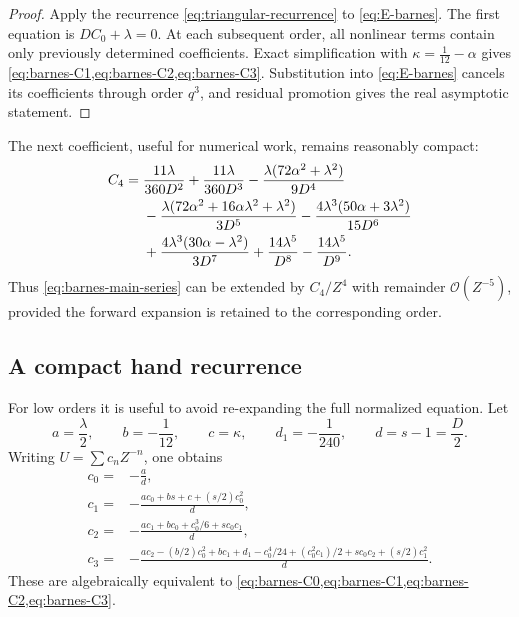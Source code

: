 \documentclass[11pt,a4paper]{article}
\numberwithin{equation}{section}
\theoremstyle{definition}
\theoremstyle{remark}
\newcommand{\Ord}{\mathcal O}
\begin{document}
\begin{proof}
Apply the recurrence \cref{eq:triangular-recurrence} to
\cref{eq:E-barnes}.  The first equation is \(DC_0+\lambda=0\).  At each
subsequent order, all nonlinear terms contain only previously determined
coefficients.  Exact simplification with
\(\kappa=\tfrac1{12}-\alpha\) gives
\cref{eq:barnes-C1,eq:barnes-C2,eq:barnes-C3}.  Substitution into
\cref{eq:E-barnes} cancels its coefficients through order \(q^3\), and
residual promotion gives the real asymptotic statement.
\end{proof}

The next coefficient, useful for numerical work, remains reasonably
compact:
\begin{align}
 C_4={}&\frac{11\lambda}{360D^2}+\frac{11\lambda}{360D^3}
 -\frac{\lambda(72\alpha^2+\lambda^2)}{9D^4}
 \notag\\
 &-\frac{\lambda(72\alpha^2+16\alpha\lambda^2+\lambda^2)}{3D^5}
 -\frac{4\lambda^3(50\alpha+3\lambda^2)}{15D^6}
 \notag\\
 &+\frac{4\lambda^3(30\alpha-\lambda^2)}{3D^7}
 +\frac{14\lambda^5}{D^8}-\frac{14\lambda^5}{D^9}.
 \label{eq:barnes-C4}
\end{align}
Thus \cref{eq:barnes-main-series} can be extended by \(C_4/Z^4\) with
remainder \(\Ord(Z^{-5})\), provided the forward expansion is retained to
the corresponding order.

\subsection{A compact hand recurrence}

For low orders it is useful to avoid re-expanding the full normalized
equation.  Let
\begin{equation}
 a=\frac\lambda2,\qquad b=-\frac1{12},\qquad c=\kappa,
 \qquad d_1=-\frac1{240},\qquad d=s-1=\frac D2.
 \label{eq:barnes-short-symbols}
\end{equation}
Writing \(U=\sum c_nZ^{-n}\), one obtains
\begin{align}
 c_0={}&-\frac{a}{d},
 \label{eq:barnes-hand0}\\
 c_1={}&-\frac{ac_0+bs+c+(s/2)c_0^2}{d},
 \label{eq:barnes-hand1}\\
 c_2={}&-\frac{ac_1+bc_0+c_0^3/6+sc_0c_1}{d},
 \label{eq:barnes-hand2}\\
 c_3={}&-\frac{ac_2-(b/2)c_0^2+bc_1+d_1-c_0^4/24
 +(c_0^2c_1)/2+sc_0c_2+(s/2)c_1^2}{d}.
 \label{eq:barnes-hand3}
\end{align}
These are algebraically equivalent to
\cref{eq:barnes-C0,eq:barnes-C1,eq:barnes-C2,eq:barnes-C3}.
\end{document}
